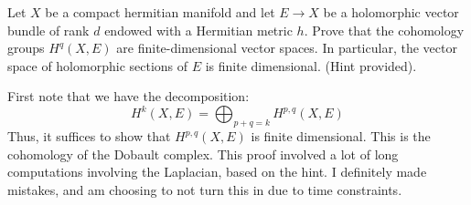 \documentclass[12pt]{article}
\begin{document}


\begin{problem}{1.1}
    Let $X$ be a compact hermitian manifold and let $E \to X$ be a holomorphic vector bundle of rank $d$ endowed with a Hermitian metric $h$. Prove that the cohomology groups $H^q(X, E)$ are finite-dimensional vector spaces. In particular, the vector space of holomorphic sections of $E$ is finite dimensional. (Hint provided).
        
\end{problem}

\begin{solution}
    First note that we have the decomposition:
    \[ H^k(X, E) = \bigoplus_{p+q=k} H^{p, q}(X, E)\]
    Thus, it suffices to show that $H^{p, q}(X, E)$ is finite dimensional. This is the cohomology of the Dobault complex. \bbni
    This proof involved a lot of long computations involving the Laplacian, based on the hint. I definitely made mistakes, and am choosing to not turn this in due to time constraints. 
\end{solution}
\newpage 
\end{document}
